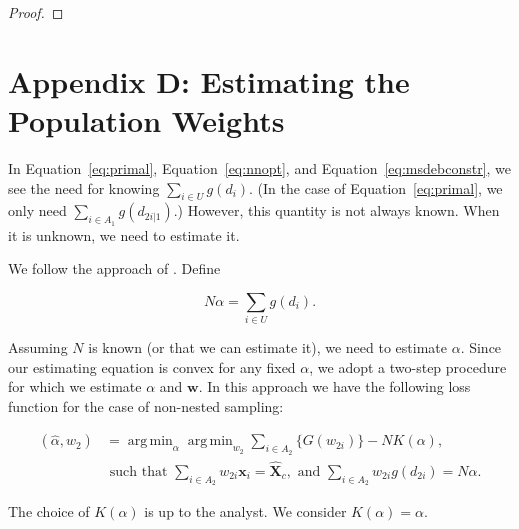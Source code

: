 \documentclass[12pt]{article}
\DeclareMathOperator*{\argmin}{arg\,min}
\renewcommand{\bf}[1]{\mathbf{#1}}
\begin{document}
\begin{proof}
\end{proof}

\section*{Appendix D: Estimating the Population Weights}

In Equation~\ref{eq:primal}, Equation~\ref{eq:nnopt}, and
Equation~\ref{eq:msdebconstr}, we see the need for knowing $\sum_{i \in U}
g(d_i)$. (In the case of Equation~\ref{eq:primal}, we only need $\sum_{i \in
A_1} g(d_{2i|1})$.) However, this quantity is not always known. When it is
unknown, we need to estimate it.

We follow the approach of \cite{kwon2024debiased}. Define 

$$N \alpha = \sum_{i \in U} g(d_i).$$

Assuming $N$ is known (or that we can estimate it), we need to estimate
$\alpha$. Since our estimating equation is convex for any fixed $\alpha$, we
adopt a two-step procedure for which we estimate $\alpha$ and $\bf w$. In this
approach we have the following loss function for the case of non-nested sampling:

\begin{align*}
  (\hat \alpha, \hat w_2) 
  &= 
  \argmin_{\alpha} \argmin_{w_2} \sum_{i \in A_2} \{G(w_{2i})\} - NK(\alpha), \\
  &\text{ such that } \sum_{i \in A_2} w_{2i} \bf x_i = \hat{\bf X}_c,
  \text{ and } \sum_{i \in A_2} w_{2i} g(d_{2i}) = N\alpha.
\end{align*}

The choice of $K(\alpha)$ is up to the analyst. We consider $K(\alpha) =
\alpha$.
\end{document}
